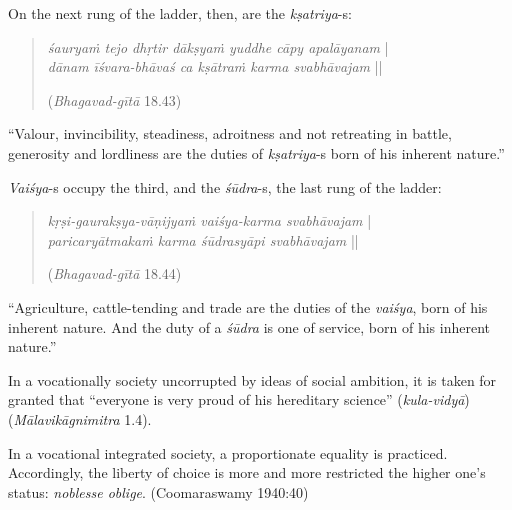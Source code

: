 \newpage

On the next rung of the ladder, then, are the {\sl kṣatriya}-s:
\begin{quote}
{{\sl śauryaṁ tejo dhṛtir dākṣyaṁ yuddhe cāpy apalāyanam}} |\\
{\sl dānam īśvara-bhāvaś ca kṣātraṁ karma svabhāvajam} || 

\hfill ({\sl Bhagavad-gītā} 18.43)
\end{quote}

\begin{myquote}
“Valour, invincibility, steadiness, adroitness and not retreating in battle, generosity and lordliness are the duties of {\sl kṣatriya}-s born of his inherent nature.”
\end{myquote}

{\sl Vaiśya}-s occupy the third, and the {\sl śūdra}-s, the last rung of the ladder: 

\begin{quote}
{{\sl kṛṣi-gaurakṣya-vāṇijyaṁ vaiśya-karma svabhāvajam}} |\\
{\sl paricaryātmakaṁ karma śūdrasyāpi svabhāvajam} || 

\hfill ({\sl Bhagavad-gītā} 18.44)
\end{quote}

\begin{myquote}
“Agriculture, cattle-tending and trade are the duties of the {\sl vaiśya}, born of his inherent nature. And the duty of a {\sl śūdra} is one of service, born of his inherent nature.”
\end{myquote}

In a vocationally society uncorrupted by ideas of social ambition, it is taken for granted that “everyone is very proud of his hereditary science” ({\sl kula-vidyā}) ({\sl Mālavikāgnimitra} 1.4).

In a vocational integrated society, a proportionate equality is practiced. Accordingly, the liberty of choice is more and more restricted the higher one’s status: {\sl noblesse oblige}. (Coomaraswamy 1940:40)

